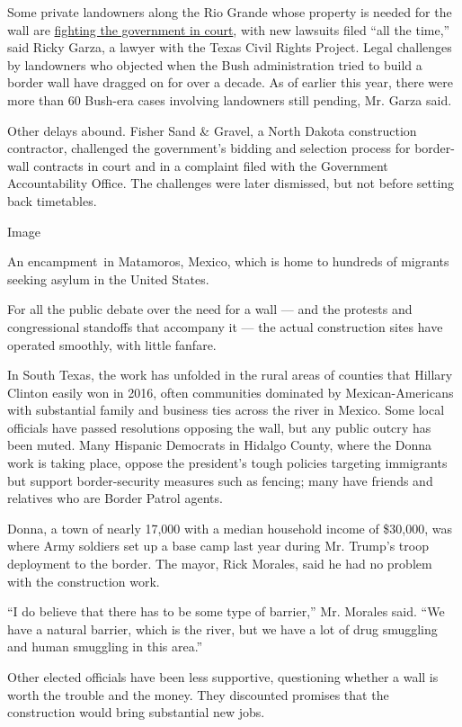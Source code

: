 Some private landowners along the Rio Grande whose property is needed
for the wall are
\href{https://www.nytimes.com/2017/05/07/us/politics/trump-wall-faces-barrier-in-texas.html}{fighting
the government in court}, with new lawsuits filed ``all the time,'' said
Ricky Garza, a lawyer with the Texas Civil Rights Project. Legal
challenges by landowners who objected when the Bush administration tried
to build a border wall have dragged on for over a decade. As of earlier
this year, there were more than 60 Bush-era cases involving landowners
still pending, Mr. Garza said.

Other delays abound. Fisher Sand \& Gravel, a North Dakota construction
contractor, challenged the government's bidding and selection process
for border-wall contracts in court and in a complaint filed with the
Government Accountability Office. The challenges were later dismissed,
but not before setting back timetables.

Image

An encampment~in Matamoros, Mexico, which is home to hundreds of
migrants seeking asylum in the United States.

For all the public debate over the need for a wall --- and the protests
and congressional standoffs that accompany it --- the actual
construction sites have operated smoothly, with little fanfare.

In South Texas, the work has unfolded in the rural areas of counties
that Hillary Clinton easily won in 2016, often communities dominated by
Mexican-Americans with substantial family and business ties across the
river in Mexico. Some local officials have passed resolutions opposing
the wall, but any public outcry has been muted. Many Hispanic Democrats
in Hidalgo County, where the Donna work is taking place, oppose the
president's tough policies targeting immigrants but support
border-security measures such as fencing; many have friends and
relatives who are Border Patrol agents.

Donna, a town of nearly 17,000 with a median household income of
\$30,000, was where Army soldiers set up a base camp last year during
Mr. Trump's troop deployment to the border. The mayor, Rick Morales,
said he had no problem with the construction work.

``I do believe that there has to be some type of barrier,'' Mr. Morales
said. ``We have a natural barrier, which is the river, but we have a lot
of drug smuggling and human smuggling in this area.''

Other elected officials have been less supportive, questioning whether a
wall is worth the trouble and the money. They discounted promises that
the construction would bring substantial new jobs.

